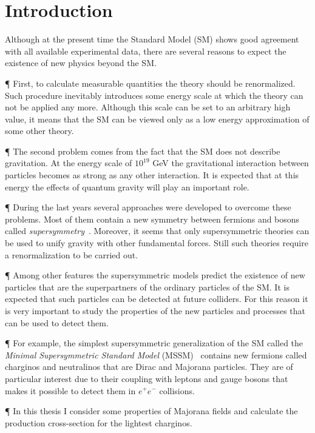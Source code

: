 \chapter{Introduction}

Although at the present time the Standard Model (SM) shows good agreement
with all available experimental data, there are several reasons 
to expect the existence of new physics beyond the SM. 

\P
First, to calculate measurable quantities the theory should be 
renormalized. Such procedure inevitably introduces some energy scale
at which the theory can not be applied any more. Although this scale can be 
set to an arbitrary high value, it means that the SM can be viewed 
only as a low energy approximation of some other theory.

\P 
The second problem comes from the fact that the SM does not describe 
gravitation. At the energy scale of $10^{19}$ GeV the gravitational 
interaction between particles becomes as strong as any other interaction. 
It is expected that at this energy the effects of quantum gravity will play 
an important role. 

\P 
During the last years several approaches were developed to overcome 
these problems. Most of them contain a new symmetry between fermions and 
bosons called {\it supersymmetry}~\cite{supersymmetry-appearance}. 
Moreover, it seems that only supersymmetric 
theories can be used to unify gravity with other fundamental 
forces. Still such theories require a renormalization to be carried out.

\P
Among other features the supersymmetric models predict the existence
of new particles that are the superpartners of the ordinary particles 
of the SM. It is expected that such particles can be detected at future
colliders. For this reason it is very important to study the properties 
of the new particles and processes that can be used to detect them.

\P 
For example, the simplest supersymmetric generalization of the SM
called the {\it Minimal Supersymmetric Standard Model} 
(MSSM)~\cite{howCharginosCome} contains new 
fermions called charginos and neutralinos 
that are Dirac and Majorana particles. They are of particular interest due 
to their coupling with leptons and gauge bosons that makes it 
possible to detect them in $e^+e^-$ collisions.

\P
In this thesis I consider some properties of Majorana fields and calculate 
the production cross-section for the lightest charginos.

